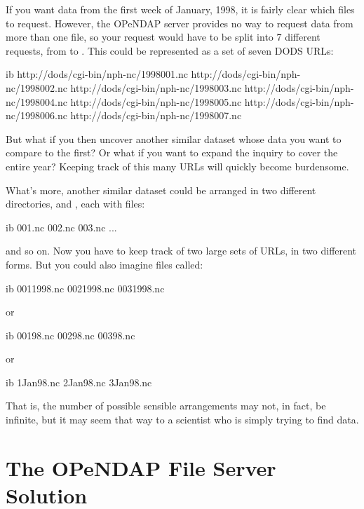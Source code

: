 If you want data from the first week of January, 1998, it is fairly
clear which files to request.  However, the OPeNDAP server provides
no way to request data from more than one file, so your request would
have to be split into 7 different requests, from  to
.  This could be represented as a set of seven DODS
URLs: 

\begin{vcode}{ib}
http://dods/cgi-bin/nph-nc/1998001.nc
http://dods/cgi-bin/nph-nc/1998002.nc
http://dods/cgi-bin/nph-nc/1998003.nc
http://dods/cgi-bin/nph-nc/1998004.nc
http://dods/cgi-bin/nph-nc/1998005.nc
http://dods/cgi-bin/nph-nc/1998006.nc
http://dods/cgi-bin/nph-nc/1998007.nc
\end{vcode}

But what if you then uncover another similar dataset whose data you
want to compare to the first?  Or what if you want to expand the
inquiry to cover the entire year?  Keeping track of this many URLs
will quickly become burdensome.

What's more, another similar dataset could be arranged in two
different directories,  and , each with files:

\begin{vcode}{ib}
001.nc
002.nc
003.nc
...
\end{vcode}

and so on.  Now you have to keep track of two large sets of URLs, in
two different forms.  But you could also imagine files called:

\begin{vcode}{ib}
0011998.nc
0021998.nc
0031998.nc
\end{vcode}

or 

\begin{vcode}{ib}
00198.nc
00298.nc
00398.nc
\end{vcode}

or 

\begin{vcode}{ib}
1Jan98.nc
2Jan98.nc
3Jan98.nc
\end{vcode}

That is, the number of possible sensible arrangements may not, in
fact, be infinite, but it may seem that way to a scientist who is
simply trying to find data.


\section{The OPeNDAP File Server Solution}
\label{fs,solution}

